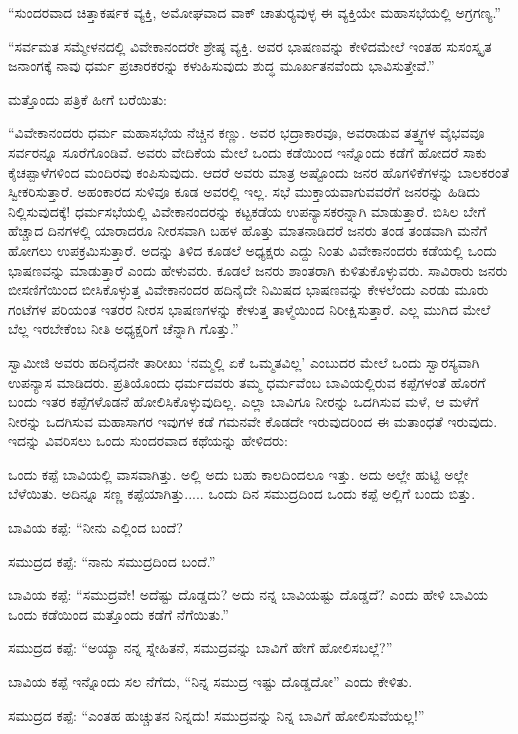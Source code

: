 “ಸುಂದರವಾದ ಚಿತ್ತಾಕರ್ಷಕ ವ್ಯಕ್ತಿ, ಅಮೋಘವಾದ ವಾಕ್ ಚಾತುರ‍್ಯವುಳ್ಳ ಈ ವ್ಯಕ್ತಿಯೇ ಮಹಾಸಭೆಯಲ್ಲಿ ಅಗ್ರಗಣ್ಯ.” 

 “ಸರ್ವಮತ ಸಮ್ಮೇಳನದಲ್ಲಿ ವಿವೇಕಾನಂದರೇ ಶ್ರೇಷ್ಠ ವ್ಯಕ್ತಿ. ಅವರ ಭಾಷಣವನ್ನು ಕೇಳಿದಮೇಲೆ ಇಂತಹ ಸುಸಂಸ್ಕೃತ ಜನಾಂಗಕ್ಕೆ ನಾವು ಧರ್ಮ ಪ್ರಚಾರಕರನ್ನು ಕಳುಹಿಸುವುದು ಶುದ್ಧ ಮೂರ್ಖತನವೆಂದು ಭಾವಿಸುತ್ತೇವೆ.” 

 ಮತ್ತೊಂದು ಪತ್ರಿಕೆ ಹೀಗೆ ಬರೆಯಿತು: 

 “ವಿವೇಕಾನಂದರು ಧರ್ಮ ಮಹಾಸಭೆಯ ನೆಚ್ಚಿನ ಕಣ್ಣು. ಅವರ ಭದ್ರಾಕಾರವೂ, ಅವರಾಡುವ ತತ್ತ್ವಗಳ ವೈಭವವೂ ಸರ್ವರನ್ನೂ ಸೂರೆಗೊಂಡಿವೆ. ಅವರು ವೇದಿಕೆಯ ಮೇಲೆ ಒಂದು ಕಡೆಯಿಂದ ಇನ್ನೊಂದು ಕಡೆಗೆ ಹೋದರೆ ಸಾಕು ಕೈಚಪ್ಪಾಳೆಗಳಿಂದ ಮಂದಿರವು ಕಂಪಿಸುವುದು. ಆದರೆ ಅವರು ಮಾತ್ರ ಅಷ್ಟೊಂದು ಜನರ ಹೊಗಳಿಕೆಗಳನ್ನು ಬಾಲಕರಂತೆ ಸ್ವೀಕರಿಸುತ್ತಾರೆ. ಅಹಂಕಾರದ ಸುಳಿವೂ ಕೂಡ ಅವರಲ್ಲಿ ಇಲ್ಲ. ಸಭೆ ಮುಕ್ತಾಯವಾಗುವವರೆಗೆ ಜನರನ್ನು ಹಿಡಿದು ನಿಲ್ಲಿಸುವುದಕ್ಕೆ! ಧರ್ಮಸಭೆಯಲ್ಲಿ ವಿವೇಕಾನಂದರನ್ನು ಕಟ್ಟಕಡೆಯ ಉಪನ್ಯಾಸಕರನ್ನಾಗಿ ಮಾಡುತ್ತಾರೆ. ಬಿಸಿಲ ಬೇಗೆ ಹೆಚ್ಚಾದ ದಿನಗಳಲ್ಲಿ ಯಾರಾದರೂ ನೀರಸವಾಗಿ ಬಹಳ ಹೊತ್ತು ಮಾತನಾಡಿದರೆ ಜನರು ತಂಡ ತಂಡವಾಗಿ ಮನೆಗೆ ಹೋಗಲು ಉಪಕ್ರಮಿಸುತ್ತಾರೆ. ಅದನ್ನು ತಿಳಿದ ಕೂಡಲೆ ಅಧ್ಯಕ್ಷರು ಎದ್ದು ನಿಂತು ವಿವೇಕಾನಂದರು ಕಡೆಯಲ್ಲಿ ಒಂದು ಭಾಷಣವನ್ನು ಮಾಡುತ್ತಾರೆ ಎಂದು ಹೇಳುವರು. ಕೂಡಲೆ ಜನರು ಶಾಂತರಾಗಿ ಕುಳಿತುಕೊಳ್ಳುವರು. ಸಾವಿರಾರು ಜನರು ಬೀಸಣಿಗೆಯಿಂದ ಬೀಸಿಕೊಳ್ಳುತ್ತ ವಿವೇಕಾನಂದರ ಹದಿನೈದೇ ನಿಮಿಷದ ಭಾಷಣವನ್ನು ಕೇಳಲೆಂದು ಎರಡು ಮೂರು ಗಂಟೆಗಳ ಪರಿಯಂತ ಇತರರ ನೀರಸ ಭಾಷಣಗಳನ್ನು ಕೇಳುತ್ತ ತಾಳ್ಮೆಯಿಂದ ನಿರೀಕ್ಷಿಸುತ್ತಾರೆ. ಎಲ್ಲ ಮುಗಿದ ಮೇಲೆ ಬೆಲ್ಲ ಇರಬೇಕೆಂಬ ನೀತಿ ಅಧ್ಯಕ್ಷರಿಗೆ ಚೆನ್ನಾಗಿ ಗೊತ್ತು.” 

 ಸ್ವಾಮೀಜಿ ಅವರು ಹದಿನೈದನೇ ತಾರೀಖು ‘ನಮ್ಮಲ್ಲಿ ಏಕೆ ಒಮ್ಮತವಿಲ್ಲ’ ಎಂಬುದರ ಮೇಲೆ ಒಂದು ಸ್ವಾರಸ್ಯವಾಗಿ ಉಪನ್ಯಾಸ ಮಾಡಿದರು. ಪ್ರತಿಯೊಂದು ಧರ್ಮದವರು ತಮ್ಮ ಧರ್ಮವೆಂಬ ಬಾವಿಯಲ್ಲಿರುವ ಕಪ್ಪೆಗಳಂತೆ ಹೊರಗೆ ಬಂದು ಇತರ ಕಪ್ಪೆಗಳೊಡನೆ ಹೋಲಿಸಿಕೊಳ್ಳುವುದಿಲ್ಲ. ಎಲ್ಲಾ ಬಾವಿಗೂ ನೀರನ್ನು ಒದಗಿಸುವ ಮಳೆ, ಆ ಮಳೆಗೆ ನೀರನ್ನು ಒದಗಿಸುವ ಮಹಾಸಾಗರ ಇವುಗಳ ಕಡೆ ಗಮನವೇ ಕೊಡದೇ ಇರುವುದರಿಂದ ಈ ಮತಾಂಧತೆ ಇರುವುದು. ಇದನ್ನು ವಿವರಿಸಲು ಒಂದು ಸುಂದರವಾದ ಕಥೆಯನ್ನು ಹೇಳಿದರು: 

 ಒಂದು ಕಪ್ಪೆ ಬಾವಿಯಲ್ಲಿ ವಾಸವಾಗಿತ್ತು. ಅಲ್ಲಿ ಅದು ಬಹು ಕಾಲದಿಂದಲೂ ಇತ್ತು. ಅದು ಅಲ್ಲೇ ಹುಟ್ಟಿ ಅಲ್ಲೇ ಬೆಳೆಯಿತು. ಅದಿನ್ನೂ ಸಣ್ಣ ಕಪ್ಪೆಯಾಗಿತ್ತು..... ಒಂದು ದಿನ ಸಮುದ್ರದಿಂದ ಒಂದು ಕಪ್ಪೆ ಅಲ್ಲಿಗೆ ಬಂದು ಬಿತ್ತು. 

 ಬಾವಿಯ ಕಪ್ಪೆ: “ನೀನು ಎಲ್ಲಿಂದ ಬಂದೆ? 

 ಸಮುದ್ರದ ಕಪ್ಪೆ: “ನಾನು ಸಮುದ್ರದಿಂದ ಬಂದೆ.” 

 ಬಾವಿಯ ಕಪ್ಪೆ: “ಸಮುದ್ರವೇ! ಅದೆಷ್ಟು ದೊಡ್ಡದು? ಅದು ನನ್ನ ಬಾವಿಯಷ್ಟು ದೊಡ್ಡದೆ? ಎಂದು ಹೇಳಿ ಬಾವಿಯ ಒಂದು ಕಡೆಯಿಂದ ಮತ್ತೊಂದು ಕಡೆಗೆ ನೆಗೆಯಿತು.”

 ಸಮುದ್ರದ ಕಪ್ಪೆ: “ಅಯ್ಯಾ ನನ್ನ ಸ್ನೇಹಿತನೆ, ಸಮುದ್ರವನ್ನು ಬಾವಿಗೆ ಹೇಗೆ ಹೋಲಿಸಬಲ್ಲೆ?” 

 ಬಾವಿಯ ಕಪ್ಪೆ ಇನ್ನೊಂದು ಸಲ ನೆಗೆದು, “ನಿನ್ನ ಸಮುದ್ರ ಇಷ್ಟು ದೊಡ್ಡದೋ” ಎಂದು ಕೇಳಿತು. 

 ಸಮುದ್ರದ ಕಪ್ಪೆ: “ಎಂತಹ ಹುಚ್ಚುತನ ನಿನ್ನದು! ಸಮುದ್ರವನ್ನು ನಿನ್ನ ಬಾವಿಗೆ ಹೋಲಿಸುವೆಯಲ್ಲ!” 

